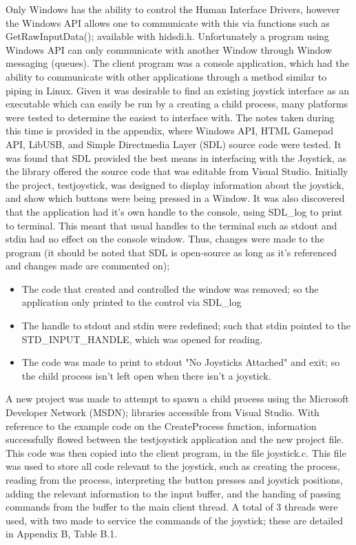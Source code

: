 \documentclass[12pt,openany,a4paper]{book}
\begin{document}
Only Windows has the ability to control the Human Interface Drivers, however the Windows API allows one to communicate with this via functions such as GetRawInputData(); available with hidsdi.h. Unfortunately a program using Windows API can only communicate with another Window through Window messaging (queues). The client program was a console application, which had the ability to communicate with other applications through a method similar to piping in Linux. Given it was desirable to find an existing joystick interface as an executable which can easily be run by a creating a child process, many platforms were tested to determine the easiest to interface with. The notes taken during this time is provided in the appendix, where Windows API, HTML Gamepad API, LibUSB, and Simple Directmedia Layer (SDL) source code were tested. It was found that SDL provided the best means in interfacing with the Joystick, as the library offered the source code that was editable from Visual Studio. Initially the project, testjoystick, was designed to display information about the joystick, and show which buttons were being pressed in a Window. It was also discovered that the application had it's own handle to the console, using SDL\_log to print to terminal. This meant that usual handles to the terminal such as stdout and stdin had no effect on the console window. Thus, changes were made to the program (it should be noted that SDL is open-source as long as it's referenced and changes made are commented on);

\begin{itemize}
	\item The code that created and controlled the window was removed; so the application only printed to the control via SDL\_log
	\item The handle to stdout and stdin were redefined; such that stdin pointed to the STD\_INPUT\_HANDLE, which was opened for reading.
	\item The code was made to print to stdout "No Joysticks Attached" and exit; so the child process isn't left open when there isn't a joystick.
\end{itemize}

A new project was made to attempt to spawn a child process using the Microsoft Developer Network (MSDN); libraries accessible from Visual Studio. With reference to the example code on the CreateProcess function, information successfully flowed between the testjoystick application and the new project file. This code was then copied into the client program, in the file joystick.c. This file was used to store all code relevant to the joystick, such as creating the process, reading from the process, interpreting the button presses and joystick positions, adding the relevant information to the input buffer, and the handing of passing commands from the buffer to the main client thread. A total of 3 threads were used, with two made to service the commands of the joystick; these are detailed in Appendix B, Table B.1.
\end{document}
